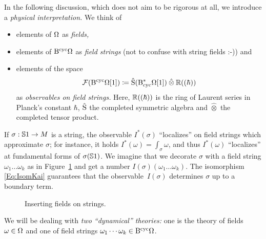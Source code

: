 \documentclass[\MainFolder/Text.tex]{subfiles}
\begin{document}
In the following discussion, which does not aim to be rigorous at all, we introduce a \emph{physical interpretation.}
We think of
\begin{itemize}
\item elements of $\Omega$ as \emph{fields,}
\item elements of $\mathrm{B}^{\mathrm{cyc}} \Omega$ as \emph{field strings} (not to confuse with string fields :-)) and
\item elements of the space
\[ \Fun(\BCyc \DR[1]) \coloneqq \hat{\Sym}(\DBCyc\DR[1])\COtimes \R((\hbar)) \]
as \emph{observables on field strings.}
Here, $\mathbb{R}((\hbar))$ is the ring of Laurent series in Planck's constant $\hbar$, $\hat{\mathrm{S}}$ the completed symmetric algebra and $\hat{\otimes}$ the completed tensor product.
\end{itemize}
If $\sigma:\mathbb{S}{1}\rightarrow M$ is a string, the observable $I^*(\sigma)$ ``localizes'' on field strings which approximate $\sigma$; for instance, it holds $I^*(\omega) = \int_{\sigma} \omega$, and thus $I^*(\omega)$ ``localizes'' at fundamental forms of $\sigma(\mathbb{S}{1})$. We imagine that we decorate $\sigma$ with a field string $\omega_1 \dotsc \omega_k$ as in Figure~\ref{Fig:GeomStr} and get a number $I(\sigma)(\omega_1\dotsc\omega_k)$. The isomorphism \eqref{Eq:IsomKai} guarantees that the observable~$I(\sigma)$ determines $\sigma$ up to a boundary term.
\begin{figure}[t]
 \centering
 \def\rad{2}
 \def\len{.4}
 \def\smalllen{.1}
 \def\num{6} 
 \caption{Inserting fields on strings.}
 \label{Fig:GeomStr}
\end{figure}

We will be dealing with \emph{two ``dynamical'' theories:} one is the theory of fields $\omega\in \Omega$ and one of field strings $\omega_1 \dotsb \omega_k \in \mathrm{B}^{\mathrm{cyc}} \Omega$.
\end{document}
